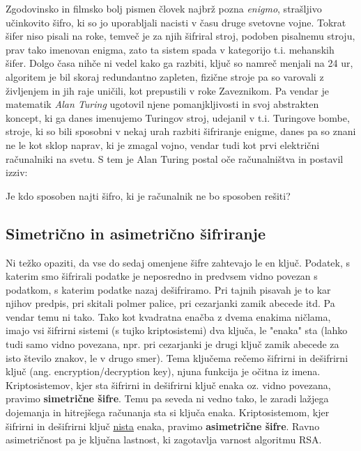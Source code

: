 \documentclass[a4paper, 12pt]{article} %
\begin{document}
Zgodovinsko in filmsko bolj pismen človek najbrž pozna \emph{enigmo}, strašljivo učinkovito šifro, ki so jo uporabljali nacisti v času druge svetovne vojne. Tokrat šifer niso pisali na roke, temveč je za njih šifriral stroj, podoben pisalnemu stroju, prav tako imenovan enigma, zato ta sistem spada v kategorijo t.i. mehanskih šifer. Dolgo časa nihče ni vedel kako ga razbiti, ključ so namreč menjali na 24 ur, algoritem je bil skoraj redundantno zapleten, fizične stroje pa so varovali z življenjem in jih raje uničili, kot prepustili v roke Zaveznikom. Pa vendar je matematik \emph{Alan Turing} ugotovil njene pomanjkljivosti in svoj abstrakten koncept, ki ga danes imenujemo Turingov stroj, udejanil v t.i. Turingove bombe, stroje, ki so bili sposobni v nekaj urah razbiti šifriranje enigme, danes pa so znani ne le kot sklop naprav, ki je zmagal vojno, vendar tudi kot prvi električni računalniki na svetu. S tem je Alan Turing postal oče računalništva in postavil izziv:

Je kdo sposoben najti šifro, ki je računalnik ne bo sposoben rešiti?

\subsection{Simetrično in asimetrično šifriranje}

Ni težko opaziti, da vse do sedaj omenjene šifre zahtevajo le en ključ. Podatek, s katerim smo šifrirali podatke je neposredno in predvsem vidno povezan s podatkom, s katerim podatke nazaj dešifriramo. Pri tajnih pisavah je to kar njihov predpis, pri skitali polmer palice, pri cezarjanki zamik abecede itd. Pa vendar temu ni tako. Tako kot kvadratna enačba z dvema enakima ničlama, imajo vsi šifrirni sistemi (s tujko kriptosistemi) dva ključa, le "enaka" sta (lahko tudi samo vidno povezana, npr. pri cezarjanki je drugi ključ zamik abecede za isto število znakov, le v drugo smer). Tema ključema rečemo šifrirni in dešifrirni ključ (ang. encryption/decryption key), njuna funkcija je očitna iz imena.
\newline
\newline
Kriptosistemov, kjer sta šifrirni in dešifrirni ključ enaka oz. vidno povezana, pravimo \textbf{simetrične šifre}. Temu pa seveda ni vedno tako, le zaradi lažjega dojemanja in hitrejšega računanja sta si ključa enaka. Kriptosistemom, kjer šifrirni in dešifrirni ključ \underline{nista} enaka, pravimo \textbf{asimetrične šifre}. Ravno asimetričnost pa je ključna lastnost, ki zagotavlja varnost algoritmu RSA.
\end{document}

